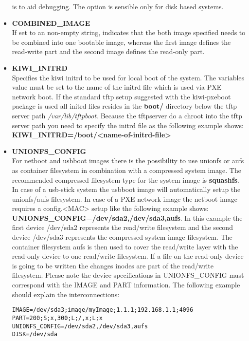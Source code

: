 \begin{itemize}
        is to aid debugging. The option is sensible only for disk based
        systems.
    \item \textbf{COMBINED\_IMAGE}\\
        If set to an non-empty string, indicates that the both
        image specified needs to be combined into one bootable
        image, whereas the first image defines the read-write
        part and the second image defines the read-only part.
    \item \textbf{KIWI\_INITRD}\\
        Specifies the kiwi initrd to be used for local boot of the
        system. The variables value must be set to the name of the
        initrd file which is used via PXE network boot. If the
        standard tftp setup suggested with the kiwi-pxeboot package
        is used all initrd files resides in the \textbf{boot/} directory
        below the tftp server path \textit{/var/lib/tftpboot}. Because
        the tftpserver do a chroot into the tftp server path you need
        to specify the initrd file as the following example shows:
        \textbf{KIWI\_INITRD=/boot/<name-of-initrd-file>}
    \item \textbf{UNIONFS\_CONFIG}\\
        For netboot and usbboot images there is the possibility to
        use unionfs or aufs as container filesystem in combination
        with a compressed system image. The recommended compressed
        filesystem type for the system image is \textbf{squashfs}.
        In case of a usb-stick system the usbboot image will
        automatically setup the unionfs/aufs filesystem. In case of
        a PXE network image the netboot image requires a config.<MAC>
        setup like the following example shows:
        \textbf{UNIONFS\_CONFIG=/dev/sda2,/dev/sda3,aufs}. In this
        example the first device /dev/sda2 represents the read/write
        filesystem and the second device /dev/sda3 represents the
        compressed system image filesystem. The container filesystem
        aufs is then used to cover the read/write layer with the
        read-only device to one read/write filesystem. If a file on
        the read-only device is going to be written the changes inodes
        are part of the read/write filesystem. Please note the device
        specifications in UNIONFS\_CONFIG must correspond with
        the IMAGE and PART information. The following example should
        explain the interconnections:

\begin{verbatim}
IMAGE=/dev/sda3;image/myImage;1.1.1;192.168.1.1;4096
PART=200;S;x,300;L;/,x;L;x
UNIONFS_CONFIG=/dev/sda2,/dev/sda3,aufs
DISK=/dev/sda
\end{verbatim}


\end{itemize}

